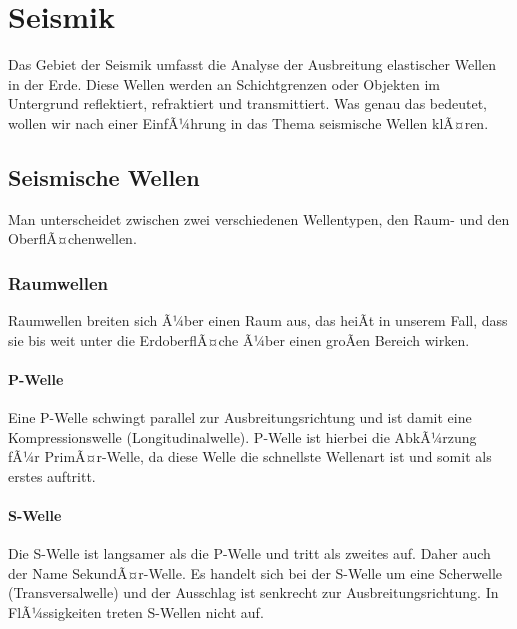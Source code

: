 \chapter{Seismik}

Das Gebiet der Seismik umfasst die Analyse der Ausbreitung elastischer Wellen in der Erde. Diese Wellen werden an Schichtgrenzen oder Objekten im Untergrund reflektiert, refraktiert und transmittiert. Was genau das bedeutet, wollen wir nach einer EinfÃ¼hrung in das Thema seismische Wellen klÃ¤ren.  

\section{Seismische Wellen} 
Man unterscheidet zwischen zwei verschiedenen Wellentypen, den Raum- und den OberflÃ¤chenwellen. 
\subsection{Raumwellen}
Raumwellen breiten sich Ã¼ber einen Raum aus, das heiÃt in unserem Fall, dass sie bis weit unter die ErdoberflÃ¤che Ã¼ber einen groÃen Bereich wirken.

\subsubsection{P-Welle}
Eine P-Welle schwingt parallel zur Ausbreitungsrichtung und ist damit eine Kompressionswelle (Longitudinalwelle). P-Welle ist hierbei die AbkÃ¼rzung fÃ¼r PrimÃ¤r-Welle, da diese Welle die schnellste Wellenart ist und somit als erstes auftritt.
 
\subsubsection{S-Welle} 
Die S-Welle ist langsamer als die P-Welle und tritt als zweites auf. Daher auch der Name SekundÃ¤r-Welle. Es handelt sich bei der S-Welle um eine Scherwelle (Transversalwelle) und der Ausschlag ist senkrecht zur Ausbreitungsrichtung. In FlÃ¼ssigkeiten treten S-Wellen nicht auf.

